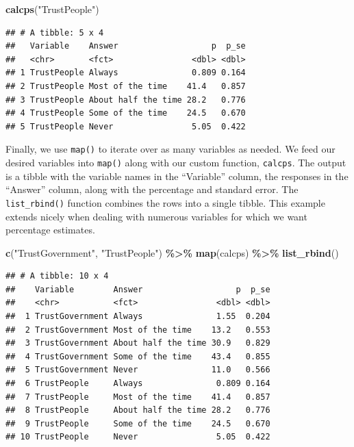 \documentclass[
]{krantz}
\makeatletter
\newenvironment{Shaded}{\begin{snugshade}}{\end{snugshade}}
\newcommand{\FunctionTok}[1]{\textcolor[rgb]{0.27,0.27,0.27}{\textbf{#1}}}
\newcommand{\NormalTok}[1]{#1}
\newcommand{\SpecialCharTok}[1]{\textcolor[rgb]{0.43,0.43,0.43}{\textbf{#1}}}
\newcommand{\StringTok}[1]{\textcolor[rgb]{0.5,0.5,0.5}{#1}}
\newenvironment{kframe}{%
\medskip{}
\setlength{\fboxsep}{.8em}
 \def\at@end@of@kframe{}%
 \ifinner\ifhmode%
  \def\at@end@of@kframe{\end{minipage}}%
  \begin{minipage}{\columnwidth}%
 \fi\fi%
 \def\FrameCommand##1{\hskip\@totalleftmargin \hskip-\fboxsep
 \colorbox{shadecolor}{##1}\hskip-\fboxsep
     \hskip-\linewidth \hskip-\@totalleftmargin \hskip\columnwidth}%
 \MakeFramed {\advance\hsize-\width
   \@totalleftmargin\z@ \linewidth\hsize
   \@setminipage}}%
 {\par\unskip\endMakeFramed%
 \at@end@of@kframe}
\renewenvironment{Shaded}{\begin{kframe}}{\end{kframe}}
\makeatother
\begin{document}
\begin{Shaded}
\begin{Highlighting}[]
\FunctionTok{calcps}\NormalTok{(}\StringTok{"TrustPeople"}\NormalTok{)}
\end{Highlighting}
\end{Shaded}

\begin{verbatim}
## # A tibble: 5 x 4
##   Variable    Answer                   p  p_se
##   <chr>       <fct>                <dbl> <dbl>
## 1 TrustPeople Always               0.809 0.164
## 2 TrustPeople Most of the time    41.4   0.857
## 3 TrustPeople About half the time 28.2   0.776
## 4 TrustPeople Some of the time    24.5   0.670
## 5 TrustPeople Never                5.05  0.422
\end{verbatim}

Finally, we use \texttt{map()} to iterate over as many variables as needed. We feed our desired variables into \texttt{map()} along with our custom function, \texttt{calcps}. The output is a tibble with the variable names in the ``Variable'' column, the responses in the ``Answer'' column, along with the percentage and standard error. The \texttt{list\_rbind()} function combines the rows into a single tibble. This example extends nicely when dealing with numerous variables for which we want percentage estimates.

\begin{Shaded}
\begin{Highlighting}[]
\FunctionTok{c}\NormalTok{(}\StringTok{"TrustGovernment"}\NormalTok{, }\StringTok{"TrustPeople"}\NormalTok{) }\SpecialCharTok{\%\textgreater{}\%}
  \FunctionTok{map}\NormalTok{(calcps) }\SpecialCharTok{\%\textgreater{}\%}
  \FunctionTok{list\_rbind}\NormalTok{()}
\end{Highlighting}
\end{Shaded}

\begin{verbatim}
## # A tibble: 10 x 4
##    Variable        Answer                   p  p_se
##    <chr>           <fct>                <dbl> <dbl>
##  1 TrustGovernment Always               1.55  0.204
##  2 TrustGovernment Most of the time    13.2   0.553
##  3 TrustGovernment About half the time 30.9   0.829
##  4 TrustGovernment Some of the time    43.4   0.855
##  5 TrustGovernment Never               11.0   0.566
##  6 TrustPeople     Always               0.809 0.164
##  7 TrustPeople     Most of the time    41.4   0.857
##  8 TrustPeople     About half the time 28.2   0.776
##  9 TrustPeople     Some of the time    24.5   0.670
## 10 TrustPeople     Never                5.05  0.422
\end{verbatim}
\end{document}
